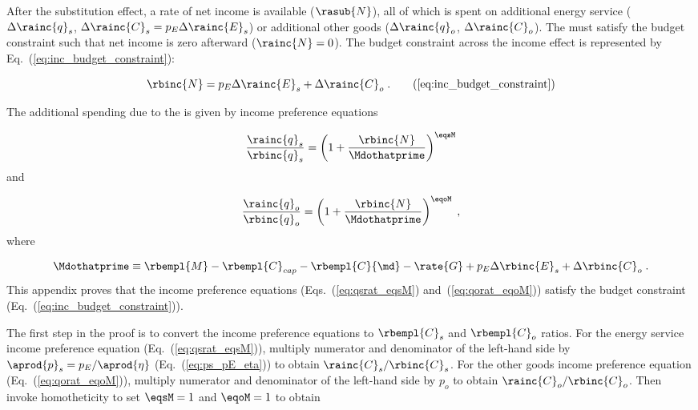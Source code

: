 

After the substitution effect, 
a rate of net income is available ($\rasub{N}$), 
all of which is spent on
additional energy service ($\Delta \rainc{q}_s$, $\Delta \rainc{C}_s = p_E \Delta \rainc{E}_s$) or 
additional other goods ($\Delta \rainc{q}_o$, $\Delta \rainc{C}_o$).
The \inceffect{} must satisfy the budget constraint
such that net income is zero afterward ($\rainc{N} = 0$).
The budget constraint across the income effect 
is represented by Eq.~(\ref{eq:inc_budget_constraint}): 

\begin{equation}
  \rbinc{N} = p_E \Delta \rainc{E}_s + \Delta \rainc{C}_o \; . \tag{\ref{eq:inc_budget_constraint}}
\end{equation}

The additional spending due to the \inceffect{} is given by income preference equations

\begin{equation} \label{eq:qsrat_eqsM}
  \frac{\rainc{q}_s}{\rbinc{q}_s} = \left( 1 + \frac{\rbinc{N}}{\Mdothatprime}  \right) ^{\eqsM}
\end{equation}
%
and

\begin{equation} \label{eq:qorat_eqoM}
  \frac{\rainc{q}_o}{\rbinc{q}_o} = \left( 1 + \frac{\rbinc{N}}{\Mdothatprime}  \right) ^{\eqoM} \; ,
\end{equation}
%
where

\begin{equation} \label{eq:effective_income}
  \Mdothatprime \equiv \rbempl{M} - \rbempl{C}_{cap} - \rbempl{C}{\md} 
                       - \rate{G} + p_E \Delta \rbinc{E}_s + \Delta \rbinc{C}_o \; .
\end{equation}
%
This appendix proves that the income preference equations 
(Eqs.~(\ref{eq:qsrat_eqsM}) and~(\ref{eq:qorat_eqoM}))
satisfy the budget constraint (Eq.~(\ref{eq:inc_budget_constraint})).

The first step in the proof is to convert 
the income preference equations
to $\rbempl{C}_s$ and $\rbempl{C}_o$ ratios.
For the energy service income preference equation (Eq.~(\ref{eq:qsrat_eqsM})), 
multiply numerator and denominator of the left-hand side by $\aprod{p}_s = p_E / \aprod{\eta}$
(Eq.~(\ref{eq:ps_pE_eta}))
to obtain $\rainc{C}_s / \rbinc{C}_s$.
For the other goods income preference equation (Eq.~(\ref{eq:qorat_eqoM})), 
multiply numerator and denominator of the left-hand side by $p_o$
to obtain $\rainc{C}_o / \rbinc{C}_o$.
Then invoke homotheticity to set $\eqsM = 1$ and $\eqoM = 1$ to obtain


